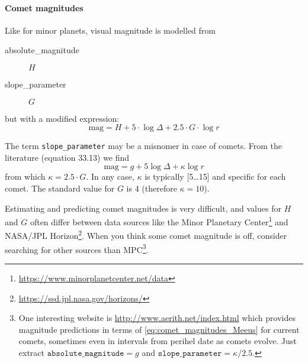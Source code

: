 \paragraph{Comet magnitudes}
Like for minor planets, visual magnitude is modelled from
\begin{description}
\item[absolute\_magnitude] $H$
\item[slope\_parameter] $G$
\end{description}
but with a modified expression:
%
\begin{equation}
  \label{eq:comet_magnitudes}
  \mathrm{mag}=H+5\cdot\log\Delta + 2.5\cdot G \cdot\log r
\end{equation}

The term \texttt{slope\_parameter} may be a misnomer in case of
comets. From the literature \citep{AstronomicalAlgorithms:1998} (equation 33.13) we find
\begin{equation}
  \label{eq:comet_magnitudes_Meeus}
  \mathrm{mag}=g+5\log\Delta + \kappa\log r
\end{equation}
from which $\kappa=2.5\cdot G$. In any case, $\kappa$ is typically [5\ldots15] and specific for each comet. The standard value for $G$ is 4 (therefore $\kappa=10$).

Estimating and predicting comet magnitudes is very difficult, and values for $H$ and $G$ often differ between data sources 
like the Minor Planetary Center\footnote{\url{https://www.minorplanetcenter.net/data}} and NASA/JPL Horizon\footnote{\url{https://ssd.jpl.nasa.gov/horizons/}}. 
When you think some comet magnitude is off, consider searching for other sources than MPC\footnote{One interesting website is \url{http://www.aerith.net/index.html} 
which provides magnitude predictions in terms of \ref{eq:comet_magnitudes_Meeus} for current comets, sometimes even in intervals from perihel date as comets evolve. 
Just extract $\mathtt{absolute\_magnitude}=g$ and $\mathtt{slope\_parameter}=\kappa/2.5$.}.


